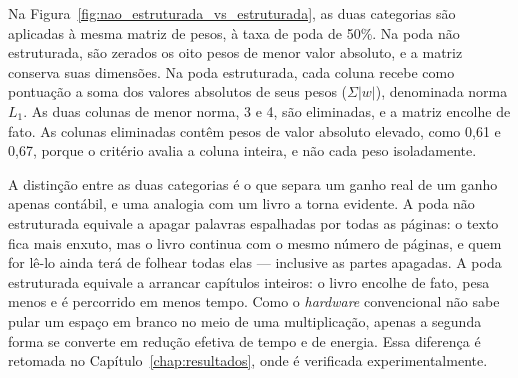 \begin{figure}[htb]
\end{figure}

Na Figura~\ref{fig:nao_estruturada_vs_estruturada}, as duas categorias são aplicadas à mesma
matriz de pesos, à taxa de poda de 50\%. Na poda não estruturada, são zerados os oito pesos de
menor valor absoluto, e a matriz conserva suas dimensões. Na poda estruturada, cada coluna
recebe como pontuação a soma dos valores absolutos de seus pesos ($\Sigma|w|$), denominada
norma $L_1$. As duas colunas de menor norma, 3 e 4, são eliminadas, e a matriz encolhe de
fato. As colunas eliminadas contêm pesos de valor absoluto elevado, como 0,61 e 0,67, porque
o critério avalia a coluna inteira, e não cada peso isoladamente.

A distinção entre as duas categorias é o que separa um ganho real de um ganho apenas
contábil, e uma analogia com um livro a torna evidente. A poda não estruturada equivale a
apagar palavras espalhadas por todas as páginas: o texto fica mais enxuto, mas o livro
continua com o mesmo número de páginas, e quem for lê-lo ainda terá de folhear todas elas
--- inclusive as partes apagadas. A poda estruturada equivale a arrancar capítulos
inteiros: o livro encolhe de fato, pesa menos e é percorrido em menos tempo. Como o
\textit{hardware} convencional não sabe pular um espaço em branco no meio de uma
multiplicação, apenas a segunda forma se converte em redução efetiva de tempo e de energia.
Essa diferença é retomada no Capítulo~\ref{chap:resultados}, onde é verificada
experimentalmente.

